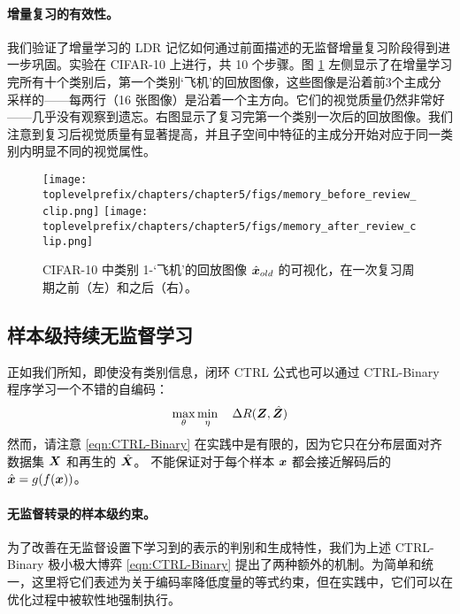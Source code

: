 \documentclass[../../book-main.tex]{subfiles}
\begin{document}
\paragraph{增量复习的有效性。}
我们验证了增量学习的 LDR 记忆如何通过前面描述的无监督增量复习阶段得到进一步巩固。实验在 CIFAR-10 上进行，共 10 个步骤。图 \ref{fig:memory_review} 左侧显示了在增量学习完所有十个类别后，第一个类别‘飞机’的回放图像，这些图像是沿着前3个主成分采样的——每两行（16 张图像）是沿着一个主方向。它们的视觉质量仍然非常好——几乎没有观察到遗忘。右图显示了复习完第一个类别一次后的回放图像。我们注意到复习后视觉质量有显著提高，并且子空间中特征的主成分开始对应于同一类别内明显不同的视觉属性。

\begin{figure}
\centering
\texttt{[image: \\toplevelprefix/chapters/chapter5/figs/memory\_before\_review\_clip.png]}
\texttt{[image: \\toplevelprefix/chapters/chapter5/figs/memory\_after\_review\_clip.png]}
 \caption{\small CIFAR-10 中类别 1-‘飞机’的回放图像 $\hat{\bm{x}}_{old}$ 的可视化，在一次复习周期之前（左）和之后（右）。} 
\label{fig:memory_review}
\end{figure}


\subsection{样本级持续无监督学习}
\label{sec:sample-wise-incremental}

正如我们所知，即使没有类别信息，闭环 CTRL 公式也可以通过 CTRL-Binary 程序学习一个不错的自编码：
\begin{align}
      \max_\theta \min_\eta \quad \Delta R(\bm{Z}, \hat{\bm{Z}}) 
 \label{eqn:CTRL-Binary}
\end{align}
然而，请注意 \eqref{eqn:CTRL-Binary} 在实践中是有限的，因为它只在分布层面对齐数据集 $\bm{X}$ 和再生的 $\hat {\bm{X}}$。
不能保证对于每个样本 $\bm{x}$ 都会接近解码后的 $\hat {\bm{x}} = g(f(\bm{x}))$。

\paragraph{无监督转录的样本级约束。} 
\label{sec:constraints}
为了改善在无监督设置下学习到的表示的判别和生成特性，我们为上述 CTRL-Binary 极小极大博弈 \eqref{eqn:CTRL-Binary} 提出了两种额外的机制。为简单和统一，这里将它们表述为关于编码率降低度量的等式约束，但在实践中，它们可以在优化过程中被软性地强制执行。
\end{document}
